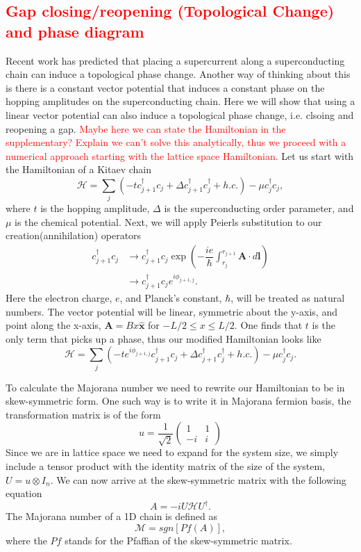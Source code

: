 \documentclass[aps,prb,showpacs,twocolumn,amsmath,amssymb,superscriptaddress]{revtex4-2}
\newcommand{\Red}[1]{\textcolor{red}{#1}}
\let\oldhat\hat
\renewcommand{\hat}[1]{\oldhat{\mathbf{#1}}}
\renewcommand{\vec}[1]{\mathbf{#1}}
\newcommand{\Ham}{\mathcal{H}}
\newcommand{\cc}{c^{\dagger}}
\newcommand{\de}{\Delta}
\begin{document}
\subsection{\Red{Gap closing/reopening (Topological Change) and phase diagram}}
Recent work has predicted that placing a supercurrent along a superconducting chain can induce a topological phase change.
Another way of thinking about this is there is a constant vector potential that induces a constant phase on the hopping amplitudes on the superconducting chain.
Here we will show that using a linear vector potential can also induce a topological phase change, i.e. clsoing and reopening a gap.
\Red{Maybe here we can state the Hamiltonian in the supplementary? Explain we can't solve this analytically, thus we proceed with a numerical approach starting with the lattice space Hamiltonian.}
Let us start with the Hamiltonian of a Kitaev chain
\begin{equation}
  \Ham = \sum_j (-t\cc_{j+1} c_j + \de \cc_{j+1}\cc_j + h.c.) - \mu \cc_j c_j,
\end{equation}
where $t$ is the hopping amplitude, $\de$ is the superconducting order parameter, and $\mu$ is the chemical potential.
Next, we will apply Peierls substitution to our creation(annihilation) operators
\begin{align}
  \cc_{j+1} c_j &\rightarrow \cc_{j+1} c_j \exp \left(-\dfrac{i e}{\hbar} \int_{r_j}^{r_{j+1}} \vec{A} \cdot d\vec{l} \right) \\ \nonumber
  &\rightarrow \cc_{j+1} c_j e^{i \phi_{j+1,j}}.
\end{align}
Here the electron charge, $e$, and Planck's constant, $\hbar$, will be treated as natural numbers. The vector potential will be linear, symmetric about the y-axis, and point along the x-axis, $\vec{A} = Bx\hat{x}$ for $-L/2 \leq x \leq L/2$.
One finds that $t$ is the only term that picks up a phase, thus our modified Hamiltonian looks like
\begin{equation}
  \Ham = \sum_j (-t e^{i\phi_{j+1,j}} \cc_{j+1} c_j + \de \cc_{j+1}\cc_j + h.c.) - \mu \cc_j c_j.
\end{equation}

To calculate the Majorana number we need to rewrite our Hamiltonian to be in skew-symmetric form.
One such way is to write it in Majorana fermion basis, the transformation matrix is of the form
\[
  u = \dfrac{1}{\sqrt{2}} \left(
  \begin{matrix}
    1 & 1 \\
    -i & i
\end{matrix} \right)
\]
Since we are in lattice space we need to expand for the system size, we simply include a tensor product with the identity matrix of the size of the system, $U = u \otimes I_n$.
We can now arrive at the skew-symmetric matrix with the following equation
\begin{equation}
  A = -i U \Ham U^{\dagger}.
\end{equation}
The Majorana number of a 1D chain is defined as
\begin{equation}
  \mathcal{M} = sgn[Pf(A)],
\end{equation}
where the $Pf$ stands for the Pfaffian of the skew-symmetric matrix.
\end{document}
